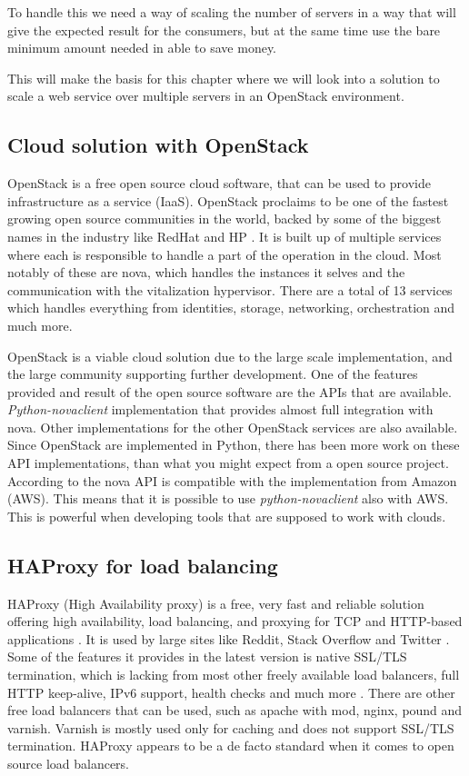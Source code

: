 To handle this we need a way of scaling the number of servers in a way that
will give the expected result for the consumers, but at the same time use the
bare minimum amount needed in able to save money.

This will make the basis for this chapter where we will look into a solution to
scale a web service over multiple servers in an OpenStack environment.

\subsection{Cloud solution with OpenStack}
OpenStack is a free open source cloud software, that can be used to provide
infrastructure as a service (IaaS). 
OpenStack proclaims to be one of the fastest growing open source communities in
the world, backed by some of the biggest names in the industry like
RedHat and HP \cite{OpenStack:2014}. It is built up of multiple services
where each is responsible to handle a part of the operation in the cloud. Most
notably of these are nova, which handles the instances it selves and the
communication with the vitalization hypervisor. There are a total of 13
services which handles everything from identities, storage, networking,
orchestration and much more.

OpenStack is a viable cloud solution due to the large scale implementation, and
the large community supporting further development. One of the features provided 
and result of the open source software are the APIs that are available. 
\textit{Python-novaclient} implementation that provides almost full integration
with nova. Other implementations for the other OpenStack services are also
available. Since OpenStack are implemented in Python, there has been more work
on these API implementations, than what you might expect from a open source
project. According to \cite{OpenStack:api_comparison} the nova API is
compatible with the implementation from Amazon (AWS). This means that it is
possible to use \textit{python-novaclient} also with AWS. This is powerful when
developing tools that are supposed to work with clouds.

\subsection{HAProxy for load balancing}
HAProxy (High Availability proxy) is a free, very fast and reliable solution offering
high availability, load balancing, and proxying for TCP and HTTP-based applications
\cite{haproxy:2014}. It is used by large sites like Reddit, Stack Overflow and
Twitter \cite{haproxy:they_use_it}. Some of the features it provides in the
latest version is native SSL/TLS termination, which is lacking from most other
freely available load balancers, full HTTP keep-alive, IPv6 support, health
checks and much more \cite{haproxy:2014}. There are other free load balancers
that can be used, such as apache with mod, nginx, pound and varnish. Varnish is
mostly used only for caching and does not support SSL/TLS termination. HAProxy
appears to be a de facto standard when it comes to open source load
balancers.

